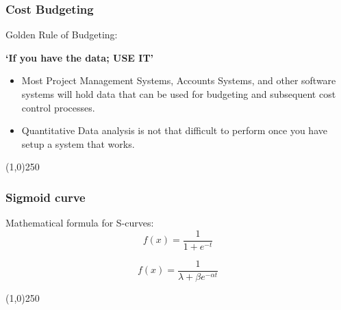 \begin{frame}
\frametitle{Cost Budgeting}
Golden Rule of Budgeting:\\

\begin{center}
\textbf{‘If you have the data; USE IT’}
\end{center}

\begin{itemize}
	\item Most Project Management Systems, Accounts Systems, and other software systems will hold data that can be used for budgeting and subsequent cost control processes.
	\item Quantitative Data analysis is not that difficult to perform once you have setup a system that works.
\end{itemize}
\end{frame}
\begin{center}\line(1,0){250}\end{center}






\begin{frame}
\frametitle{Sigmoid curve}
Mathematical formula for S-curves: \\

\[
f(x) = \frac{1}{1+e^{-t}}
\]

\[
f(x) = \frac{1}{\lambda+\beta e^{-\alpha t}}
\]



\end{frame}
\begin{center}\line(1,0){250}\end{center}




